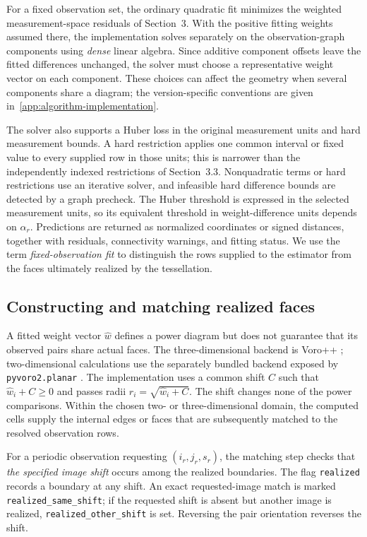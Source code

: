 For a fixed observation set, the ordinary quadratic fit minimizes the weighted measurement-space residuals of Section~3. With the positive fitting weights assumed there, the implementation solves separately on the observation-graph components using \emph{dense} linear algebra. Since additive component offsets leave the fitted differences unchanged, the solver must choose a representative weight vector on each component. These choices can affect the geometry when several components share a diagram; the version-specific conventions are given in~\ref{app:algorithm-implementation}.

The solver also supports a Huber loss in the original measurement units and hard measurement bounds. A hard restriction applies one common interval or fixed value to every supplied row in those units; this is narrower than the independently indexed restrictions of Section~3.3. Nonquadratic terms or hard restrictions use an iterative solver, and infeasible hard difference bounds are detected by a graph precheck. The Huber threshold is expressed in the selected measurement units, so its equivalent threshold in weight-difference units depends on $\alpha_r$. Predictions are returned as normalized coordinates or signed distances, together with residuals, connectivity warnings, and fitting status. We use the term \emph{fixed-observation fit} to distinguish the rows supplied to the estimator from the faces ultimately realized by the tessellation.

\subsection{Constructing and matching realized faces}
\label{subsec:workflow-realization}

A fitted weight vector $\widehat w$ defines a power diagram but does not guarantee that its observed pairs share actual faces. The three-dimensional backend is Voro++ \citep{Rycroft2009}; two-dimensional calculations use the separately bundled backend exposed by \texttt{pyvoro2.planar} \citep{Pyvoro2_063}. The implementation uses a common shift $C$ such that $\widehat w_i+C\ge0$ and passes radii $r_i=\sqrt{\widehat w_i+C}$. The shift changes none of the power comparisons. Within the chosen two- or three-dimensional domain, the computed cells supply the internal edges or faces that are subsequently matched to the resolved observation rows.

For a periodic observation requesting $(i_r,j_r,s_r)$, the matching step checks that \emph{the specified image shift} occurs among the realized boundaries. The flag \texttt{realized} records a boundary at any shift. An exact requested-image match is marked \texttt{realized\_\allowbreak same\_\allowbreak shift}; if the requested shift is absent but another image is realized, \texttt{realized\_\allowbreak other\_\allowbreak shift} is set. Reversing the pair orientation reverses the shift.

